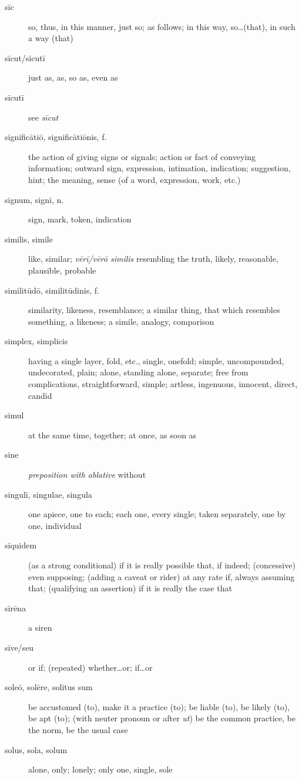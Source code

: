 \begin{description}
    \item[sīc] \marginnote{*}so, thus, in this manner, just so; as follows; in this way, so\dots (that), in such a way (that)
    \item[sīcut/sīcutī] just as, as, so as, even as
    \item[sīcutī] see \textit{sīcut}
    \item[significātiō, significātiōnis, f.] the action of giving signs or signals; action or fact of conveying information; outward sign, expression, intimation, indication; suggestion, hint; the meaning, sense (of a word, expression, work, etc.)
    \item[signum, signī, n.] sign, mark, token, indication
    \item[similis, simile] \marginnote{*}like, similar; \textit{vērī/vērō similis} resembling the truth, likely, reasonable, plausible, probable
    \item[similitūdō, similitūdinis, f.] similarity, likeness, resemblance; a similar thing, that which resembles something, a likeness; a simile, analogy, comparison
    \item[simplex, simplicis] having a single layer, fold, etc., single, onefold; simple, uncompounded, undecorated, plain; alone, standing alone, separate; free from complications, straightforward, simple; artless, ingenuous, innocent, direct, candid
    \item[simul] \marginnote{*}at the same time, together; at once, as soon as
    \item[sine] \marginnote{*}\textit{preposition with ablative} without
    \item[singulī, singulae, singula] \marginnote{*}one apiece, one to each; each one, every single; taken separately, one by one, individual
    \item[sīquidem] (as a strong conditional) if it is really possible that, if indeed; (concessive) even supposing; (adding a caveat or rider) at any rate if, always assuming that; (qualifying an assertion) if it is really the case that
    \item[sīrēna] a siren
    \item[sīve/seu] \marginnote{*}or if; (repeated) whether\dots or; if\dots or
    \item[soleō, solēre, solitus sum] \marginnote{*}be accustomed (to), make it a practice (to); be liable (to), be likely (to), be apt (to); (with neuter pronoun or after \textit{ut}) be the common practice, be the norm, be the usual case
    \item[solus, sola, solum] \marginnote{*}alone, only; lonely; only one, single, sole

\end{description}
